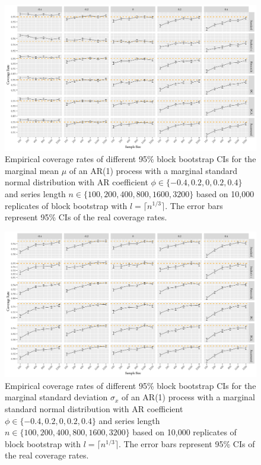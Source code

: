 \documentclass[10pt]{article}
\begin{document}


\begin{figure}[tbp]
  \centering
  \includegraphics[width=\textwidth]{figures/plot_norm_mu_1}
  \caption{Empirical coverage rates of different 95\% block bootstrap CIs for
    the marginal mean $\mu$ of an AR(1) process with a marginal standard 
    normal distribution with AR coefficient
    $\phi \in \{-0.4, 0.2, 0, 0.2, 0.4\}$ and series length
    $n \in \{100, 200, 400, 800, 1600, 3200\}$ based on 10,000 replicates of
    block bootstrap with $l = \lceil n^{1/3} \rceil$. The
    error bars represent 95\% CIs of the real coverage rates.}
  \label{fig:mu1}
\end{figure}


\begin{figure}[bp]
  \centering
  \includegraphics[width=\textwidth]{figures/plot_norm_sigma_1}
  \caption{Empirical coverage rates of different 95\% block bootstrap CIs for
    the marginal standard deviation $\sigma_x$ of an AR(1) process with a
    marginal standard normal distribution with AR 
    coefficient $\phi \in \{-0.4, 0.2, 0, 0.2, 0.4\}$ and series length 
    $n \in \{100, 200, 400, 800, 1600, 3200\}$ based on 10,000 replicates of
    block bootstrap with $l = \lceil n^{1/3} \rceil$. The 
    error bars represent 95\% CIs of the real coverage rates.}
  \label{fig:sigma1}
\end{figure}
\end{document}
